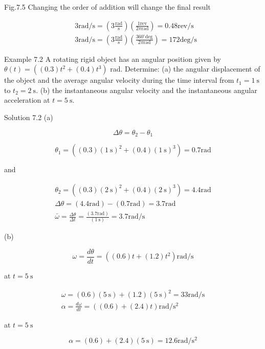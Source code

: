 \documentclass[10pt]{article}
\begin{document}
Fig.7.5 Changing the order of addition will change the final result

$$
\begin{aligned}
& 3 \mathrm{rad} / \mathrm{s}=\left(3 \frac{\mathrm{rad}}{\mathrm{s}}\right)\left(\frac{1 \mathrm{rev}}{2 \pi \mathrm{rad}}\right)=0.48 \mathrm{rev} / \mathrm{s} \\
& 3 \mathrm{rad} / \mathrm{s}=\left(3 \frac{\mathrm{rad}}{\mathrm{s}}\right)\left(\frac{360^{\circ} \mathrm{deg}}{2 \pi \mathrm{rad}}\right)=172 \mathrm{deg} / \mathrm{s}
\end{aligned}
$$

Example 7.2 A rotating rigid object has an angular position given by $\theta(t)=\left((0.3) t^{2}+(0.4) t^{3}\right)$ rad. Determine: (a) the angular displacement of the object and the average angular velocity during the time interval from $t_{1}=1 \mathrm{~s}$ to $t_{2}=2 \mathrm{~s}$. (b) the instantaneous angular velocity and the instantaneous angular acceleration at $t=5 \mathrm{~s}$.

Solution 7.2 (a)

$$
\Delta \theta=\theta_{2}-\theta_{1}
$$

$$
\theta_{1}=\left((0.3)(1 \mathrm{~s})^{2}+(0.4)(1 \mathrm{~s})^{3}\right)=0.7 \mathrm{rad}
$$

and

$$
\begin{gathered}
\theta_{2}=\left((0.3)(2 \mathrm{~s})^{2}+(0.4)(2 \mathrm{~s})^{3}\right)=4.4 \mathrm{rad} \\
\Delta \theta=(4.4 \mathrm{rad})-(0.7 \mathrm{rad})=3.7 \mathrm{rad} \\
\bar{\omega}=\frac{\Delta \theta}{\Delta t}=\frac{(3.7 \mathrm{rad})}{(1 \mathrm{~s})}=3.7 \mathrm{rad} / \mathrm{s}
\end{gathered}
$$

(b)

$$
\omega=\frac{d \theta}{d t}=\left((0.6) t+(1.2) t^{2}\right) \mathrm{rad} / \mathrm{s}
$$

at $t=5 \mathrm{~s}$

$$
\begin{gathered}
\omega=(0.6)(5 \mathrm{~s})+(1.2)(5 \mathrm{~s})^{2}=33 \mathrm{rad} / \mathrm{s} \\
\alpha=\frac{d \omega}{d t}=((0.6)+(2.4) t) \mathrm{rad} / \mathrm{s}^{2}
\end{gathered}
$$

at $t=5 \mathrm{~s}$

$$
\alpha=(0.6)+(2.4)(5 \mathrm{~s})=12.6 \mathrm{rad} / \mathrm{s}^{2}
$$
\end{document}
